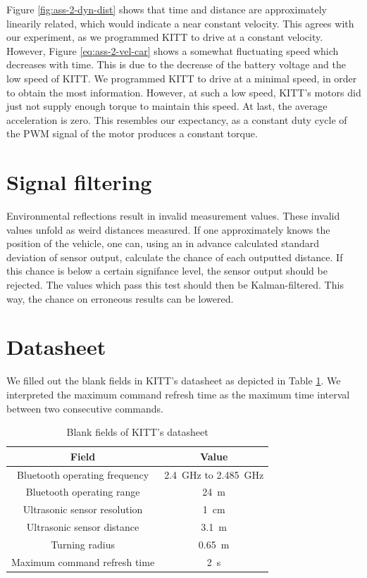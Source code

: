 \documentclass[11pt,titlepage]{report}
\begin{document}
Figure \ref{fig:ass-2-dyn-dist} shows that time and distance are approximately linearily related, which would indicate a near constant velocity. This agrees with our experiment, as we programmed KITT to drive at a constant velocity. However, Figure \ref{eq:ass-2-vel-car} shows a somewhat fluctuating speed which decreases with time. This is due to the decrease of the battery voltage and the low speed of KITT. We programmed KITT to drive at a minimal speed, in order to obtain the most information. However, at such a low speed, KITT's motors did just not supply enough torque to maintain this speed. At last, the average acceleration is zero. This resembles our expectancy, as a constant duty cycle of the PWM signal of the motor produces a constant torque.

\section{Signal filtering}
Environmental reflections result in invalid measurement values. These invalid values unfold as weird distances measured. If one approximately knows the position of the vehicle, one can, using an in advance calculated standard deviation of sensor output, calculate the chance of each outputted distance. If this chance is below a certain signifance level, the sensor output should be rejected. The values which pass this test should then be Kalman-filtered. This way, the chance on erroneous results can be lowered.

\section{Datasheet}
We filled out the blank fields in KITT's datasheet as depicted in Table \ref{tab:ass2-datasheet}. We interpreted the maximum command refresh time as the maximum time interval between two consecutive commands.

\begin{table}[H]
	\centering
	\caption{Blank fields of KITT's datasheet}
	\label{tab:ass2-datasheet}
	\begin{tabular}{c c}
		\hline\hline
		Field & Value \\
		\hline
		Bluetooth operating frequency & \SI{2.4}{GHz} to \SI{2.485}{GHz} \\
		Bluetooth operating range & \SI{24}{m} \\
		Ultrasonic sensor resolution & \SI{1}{cm} \\
		Ultrasonic sensor distance & \SI{3.1}{m} \\
		Turning radius & \SI{0.65}{m} \\
		Maximum command refresh time & \SI{2}{s} \\
		\hline
		\end{tabular}
\end{table}
\end{document}
